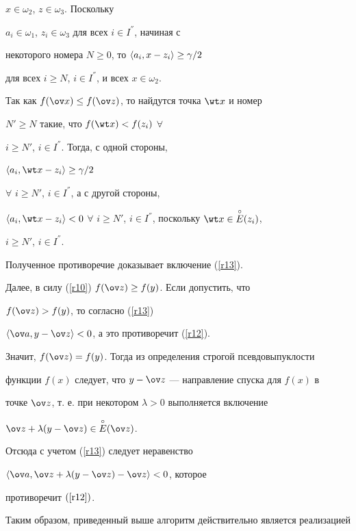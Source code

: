 \begin{pf}
$x\in \omega_2$, $z\in \omega_3$. Поскольку


$a_i\in \omega_1$, $z_i\in \omega_3$ для всех $i\in I^{''}$, начиная с


некоторого номера $N\ge 0$, то $\langle a_i, x- z_i \rangle \ge \gamma /2$


для всех $i\ge N$, $i\in I^{''}$, и всех $x\in \omega_2$.


Так как $f(\ov x)\le f(\ov z)$, то найдутся точка $\wt x$ и номер


$N'\ge N$ такие, что $f(\wt x)< f(z_i)$ $\forall$


$i\ge N'$, $i\in I^{''}$. Тогда, с одной стороны,


$\la a_i, \wt x- z_i \ra \ge \gamma /2$


$\forall$ $i\ge N'$, $i\in I^{''}$, а с другой стороны,


$\la a_i, \wt x- z_i \ra <0$ $\forall$ $i\ge N'$, $i\in


I^{''}$, поскольку $\wt x \in \overset{\circ}{E}{}(z_i)$,


$i\ge N'$, $i\in I^{''}$.


Полученное противоречие доказывает включение (\ref{r13}).





Далее, в силу (\ref{r10}) $f(\ov z)\ge f(y)$. Если допустить, что


$f(\ov z)> f(y)$, то согласно (\ref{r13})


$\la \ov a, y- \ov z \ra <0$, а это противоречит (\ref{r12}).


Значит, $f(\ov z)= f(y)$. Тогда из определения строгой псевдовыпуклости


функции $f(x)$ следует, что $y-\ov z$ --- направление спуска для $f(x)$ в


точке $\ov z$, т. е. при некотором $\lambda >0$ выполняется включение


$\ov z + \lambda (y- \ov z) \in \overset{\circ}{E}{}(\ov z)$.


Отсюда с учетом (\ref{r13}) следует неравенство


$\la \ov a, \ov z + \lambda (y-\ov z) - \ov z \ra <0$, которое


противоречит $(\ref{r12})$.


\end{pf}








Таким образом, приведенный выше алгоритм действительно является реализацией


